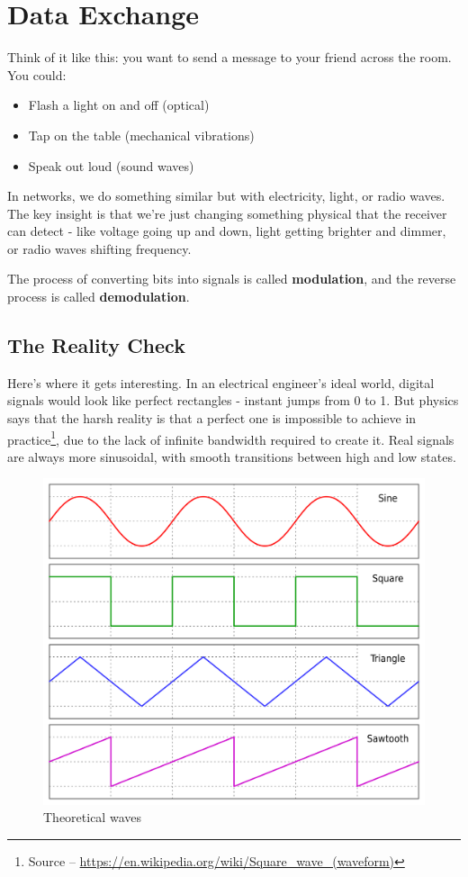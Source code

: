 \section{Data Exchange}
Think of it like this: you want to send a message to your friend across the room. You could:
\begin{itemize}
    \item Flash a light on and off (optical)
    \item Tap on the table (mechanical vibrations)
    \item Speak out loud (sound waves)
\end{itemize}

In networks, we do something similar but with electricity, light, or radio waves. The key insight is that we're just changing something physical that the receiver can detect - like voltage going up and down, light getting brighter and dimmer, or radio waves shifting frequency.

\begin{importantblock}
    The process of converting bits into signals is called \textbf{modulation}, and the reverse process is called \textbf{demodulation}.
\end{importantblock}



\subsection{The Reality Check}

Here's where it gets interesting. In an electrical engineer's ideal world, digital signals would look like perfect rectangles - instant jumps from 0 to 1. But physics says that the harsh reality is that a perfect one is impossible to achieve in practice\footnote{Source -- \href{https://en.wikipedia.org/wiki/Square_wave_(waveform)\#Characteristics_of_imperfect_square_waves}{https://en.wikipedia.org/wiki/Square\_wave\_(waveform)}}, due to the lack of infinite bandwidth required to create it. Real signals are always more sinusoidal, with smooth transitions between high and low states.

\begin{figure}[h]
    \centering
    \includegraphics[width=.7\textwidth]{assets/osi/physical/waves.png}
    \caption{Theoretical waves}\label{fig:theoretical_waves}
\end{figure}

